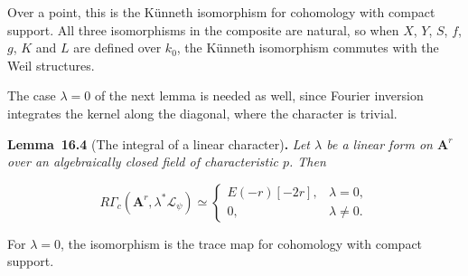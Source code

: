 \documentclass[11pt]{article}
\newenvironment{bpstatement}[2]{\par\addvspace{0.6\baselineskip}\noindent\textbf{#1}#2\textbf{.}\enspace\ignorespaces}
  {\par\addvspace{0.4\baselineskip}}
\newenvironment{bpstatementit}[2]{\begin{bpstatement}{#1}{#2}\itshape\ignorespaces}{\end{bpstatement}}
\begin{document}
\label{bp178}%
Over a point, this is the Künneth isomorphism for cohomology with compact support. All three isomorphisms in the composite are natural, so when \(X\), \(Y\), \(S\), \(f\), \(g\), \(K\) and \(L\) are defined over \(k_0\), the Künneth isomorphism commutes with the Weil structures.

The case \(\lambda=0\) of the next lemma is needed as well, since Fourier inversion integrates the kernel along the diagonal, where the character is trivial.

\label{bp179}%
\begin{bpstatementit}{Lemma~16.4}{ (The integral of a linear character)}
Let \(\lambda\) be a linear form on \(\mathbf A^r\) over an algebraically closed field of characteristic \(p\). Then

\[
R\Gamma_c(\mathbf A^r,\lambda^*\mathcal L_\psi)
\simeq
\begin{cases}
E(-r)[-2r],&\lambda=0,\\
0,&\lambda\ne0.
\end{cases}
\]

For \(\lambda=0\), the isomorphism is the trace map for cohomology with compact support.
\end{bpstatementit}
\end{document}
